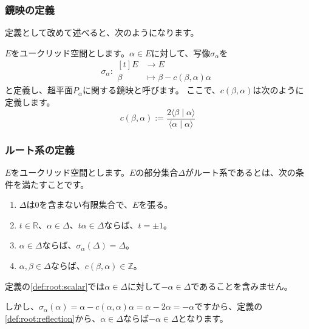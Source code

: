 \documentclass{beamer}
\begin{document}
\begin{frame}
    \frametitle{鏡映の定義}

    定義として改めて述べると、次のようになります。

    \begin{definition}[鏡映]
        $E$をユークリッド空間とします。$α∈E$に対して、写像$σ_α$を
        \begin{equation}
            σ_α:
            \begin{aligned}[t]
                E & \to E             \\
                β & \mapsto β-c(β,α)α
            \end{aligned}
        \end{equation}
        と定義し、超平面$P_α$に関する鏡映と呼びます。
        ここで、$c(β,α)$は次のように定義します。
        \begin{equation}
            c(β,α):=\frac{2⟨β∣α⟩}{⟨α∣α⟩}
        \end{equation}
    \end{definition}
\end{frame}

\begin{frame}
    \frametitle{ルート系の定義}

    \begin{definition}[ルート系]
        $E$をユークリッド空間とします。$E$の部分集合$Δ$がルート系であるとは、次の条件を満たすことです。
        \begin{enumerate}
            \item $Δ$は$0$を含まない有限集合で、$E$を張る。
            \item\label{def:root:scalar} $t∈ℝ$、$α∈Δ$、$tα∈Δ$ならば、$t=±1$。
            \item\label{def:root:reflection} $α∈Δ$ならば、$σ_α(Δ)=Δ$。
            \item\label{def:root:integer} $α,β∈Δ$ならば、$c(β,α)∈ℤ$。
        \end{enumerate}
    \end{definition}

    定義の\autoref{def:root:scalar}では$α∈Δ$に対して$-α∈Δ$であることを含みません。

    しかし、$σ_α(α)=α-c(α,α)α=α-2α=-α$ですから、定義の\autoref{def:root:reflection}から、$α∈Δ$ならば$-α∈Δ$となります。
\end{frame}
\end{document}
